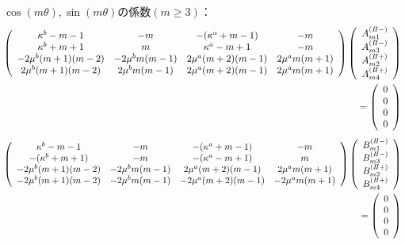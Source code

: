 $\cos(m\theta),\sin(m\theta)$の係数$(m\geq3)$：
\begin{align}
	\left(
	\begin{array}{cccc}
		\kappa^b-m-1& -m & -(\kappa^a+m-1) & -m \\
		\kappa^b+m+1 & m & \kappa^a-m+1 & -m \\
		-2\mu^{b}(m+1)(m-2) & -2\mu^{b}m(m-1) &
		2\mu^{a}(m+2)(m-1) & 2\mu^{a}m(m+1) \\
		2\mu^{b}(m+1)(m-2) & 2\mu^{b}m(m-1) &
		2\mu^{a}(m+2)(m-1) & 2\mu^{a}m(m+1) \\
	\end{array}
	\right)
	\left(
	\begin{array}{c}
		A_{m1}^{(I\hspace{-.15em}I-)} \\
	 	A_{m3}^{(I\hspace{-.15em}I-)} \\
		A_{m2}^{(I\hspace{-.15em}I+)}\\
	 	A_{m4}^{(I\hspace{-.15em}I+)} \\
	\end{array}
	\right)
	\nonumber
	\\
	=
	\left(
	\begin{array}{c}
		0 \\
	 	0 \\
		0 \\
	 	0 \\
	\end{array}
	\right)
\end{align}
\begin{align}
	\left(
	\begin{array}{cccc}
		\kappa^b-m-1& -m & -(\kappa^a+m-1) & -m \\
		-(\kappa^b+m+1) & -m & -(\kappa^a-m+1) & m \\
		-2\mu^{b}(m+1)(m-2) & -2\mu^{b}m(m-1) &
		2\mu^{a}(m+2)(m-1) & 2\mu^{a}m(m+1) \\
		-2\mu^{b}(m+1)(m-2) & -2\mu^{b}m(m-1) &
		-2\mu^{a}(m+2)(m-1) & -2\mu^{a}m(m+1) \\
	\end{array}
	\right)
	\left(
	\begin{array}{c}
		B_{m1}^{(I\hspace{-.15em}I-)} \\
	 	B_{m3}^{(I\hspace{-.15em}I-)} \\
		B_{m2}^{(I\hspace{-.15em}I+)}\\
	 	B_{m4}^{(I\hspace{-.15em}I+)} \\
	\end{array}
	\right)
	\nonumber
	\\
	=
	\left(
	\begin{array}{c}
		0 \\
	 	0 \\
		0 \\
	 	0 \\
	\end{array}
	\right)
\end{align}

